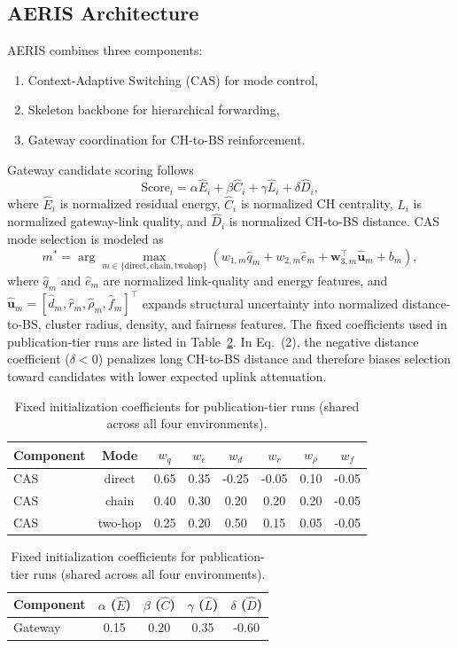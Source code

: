 ﻿\documentclass[sensors,article,submit,moreauthors,pdftex]{Definitions/mdpi}
\begin{document}
\subsection{AERIS Architecture}
AERIS combines three components:
\begin{enumerate}
\item Context-Adaptive Switching (CAS) for mode control,
\item Skeleton backbone for hierarchical forwarding,
\item Gateway coordination for CH-to-BS reinforcement.
\end{enumerate}
Gateway candidate scoring follows
\begin{equation}
\mathrm{Score}_i = \alpha \hat{E}_i + \beta \hat{C}_i + \gamma \hat{L}_i + \delta \hat{D}_i,
\end{equation}
where $\hat{E}_i$ is normalized residual energy, $\hat{C}_i$ is normalized CH centrality, $\hat{L}_i$ is normalized gateway-link quality, and $\hat{D}_i$ is normalized CH-to-BS distance.
CAS mode selection is modeled as
\begin{equation}
m^{*}=\arg\max_{m\in\{\mathrm{direct},\mathrm{chain},\mathrm{twohop}\}}
\left(w_{1,m}\hat{q}_{m}+w_{2,m}\hat{e}_{m}+\mathbf{w}_{3,m}^{\top}\hat{\mathbf{u}}_{m}+b_m\right),
\end{equation}
where $\hat{q}_{m}$ and $\hat{e}_{m}$ are normalized link-quality and energy features, and $\hat{\mathbf{u}}_{m}=[\hat{d}_{m},\hat{r}_{m},\hat{\rho}_{m},\hat{f}_{m}]^{\top}$ expands structural uncertainty into normalized distance-to-BS, cluster radius, density, and fairness features.
The fixed coefficients used in publication-tier runs are listed in Table~\ref{tab:cas_gateway_coeffs}. In Eq.~(2), the negative distance coefficient ($\delta<0$) penalizes long CH-to-BS distance and therefore biases selection toward candidates with lower expected uplink attenuation.
\begin{table}[H]
\caption{Fixed initialization coefficients for publication-tier runs (shared across all four environments).}
\label{tab:cas_gateway_coeffs}
\centering
\small
\begin{tabular}{lccccccc}
\toprule
Component & Mode & $w_q$ & $w_e$ & $w_d$ & $w_r$ & $w_{\rho}$ & $w_f$ \\
\midrule
CAS & direct & 0.65 & 0.35 & -0.25 & -0.05 & 0.10 & -0.05 \\
CAS & chain & 0.40 & 0.30 & 0.20 & 0.20 & 0.20 & -0.05 \\
CAS & two-hop & 0.25 & 0.20 & 0.50 & 0.15 & 0.05 & -0.05 \\
\bottomrule
\end{tabular}
\vspace{1.5mm}
\begin{tabular}{lcccc}
\toprule
Component & $\alpha$ ($\hat{E}$) & $\beta$ ($\hat{C}$) & $\gamma$ ($\hat{L}$) & $\delta$ ($\hat{D}$) \\
\midrule
Gateway & 0.15 & 0.20 & 0.35 & -0.60 \\
\bottomrule
\end{tabular}
\end{table}
\end{document}
